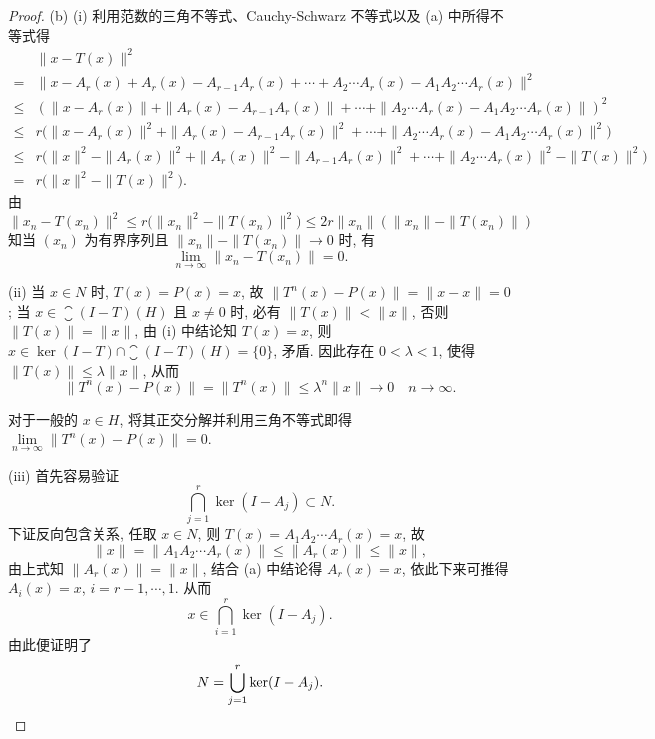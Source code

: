\begin{proof}
    (b) (i) 利用范数的三角不等式、Cauchy-Schwarz 不等式以及 (a) 中所得不等式得
    \begin{align*}
               & \|x-T(x)\|^2 \\
        ={}    & \|x-A_r(x)+A_r(x)-A_{r-1}A_r(x)+\cdots+A_2\cdots A_r(x)-A_1A_2\cdots A_r(x)\|^2 \\
        \leq{} & (\|x-A_r(x)\|+\|A_r(x)-A_{r-1}A_r(x)\|+\cdots+\|A_2\cdots A_r(x)-A_1A_2\cdots A_r(x)\|)^2 \\
        \leq{} & r\bigl(\|x-A_r(x)\|^2+\|A_r(x)-A_{r-1}A_r(x)\|^2+\cdots+\|A_2\cdots A_r(x)-A_1A_2\cdots A_r(x)\|^2\bigr) \\
        \leq{} & r\bigl(\|x\|^2-\|A_r(x)\|^2+\|A_r(x)\|^2-\|A_{r-1}A_r(x)\|^2+\cdots+\|A_2\cdots A_r(x)\|^2-\|T(x)\|^2\bigr) \\
        ={}    & r\bigl(\|x\|^2-\|T(x)\|^2\bigr).
    \end{align*}
    由
    \[\|x_n-T(x_n)\|^2\leq r\bigl(\|x_n\|^2-\|T(x_n)\|^2\bigr)\leq 2r\|x_n\|(\|x_n\|-\|T(x_n)\|)\]
    知当 $(x_n)$ 为有界序列且 $\|x_n\|-\|T(x_n)\|\to 0$ 时, 有
    \[\lim_{n\to\infty} \|x_n-T(x_n)\|=0.\]

    (ii) 当 $x\in N$ 时, $T(x)=P(x)=x$, 故 $\|T^n(x)-P(x)\|=\|x-x\|=0$;
    当 $x\in\closure{(I-T)(H)}$ 且 $x\ne 0$ 时, 必有 $\|T(x)\|<\|x\|$,
    否则 $\|T(x)\|=\|x\|$, 由 (i) 中结论知 $T(x)=x$, 则
    $x\in\ker(I-T)\cap\closure{(I-T)(H)}=\{0\}$, 矛盾. 因此存在 $0<\lambda<1$,
    使得 $\|T(x)\|\leq\lambda\|x\|$, 从而
    \[\|T^n(x)-P(x)\|=\|T^n(x)\|\leq\lambda^n\|x\|\to 0\quad n\to\infty.\]

    对于一般的 $x\in H$, 将其正交分解并利用三角不等式即得 $\lim\limits_{n\to\infty}\|T^n(x)-P(x)\|=0$.

    (iii) 首先容易验证
    \[\bigcap_{j=1}^r \ker(I-A_j)\subset N.\]
    下证反向包含关系, 任取 $x\in N$, 则 $T(x)=A_1A_2\cdots A_{r}(x)=x$, 故
    \[\|x\|=\|A_1A_2\cdots A_r(x)\|\leq\|A_r(x)\|\leq\|x\|,\]
    由上式知 $\|A_r(x)\|=\|x\|$, 结合 (a) 中结论得 $A_r(x)=x$, 依此下来可推得
    $A_i(x)=x$, $i=r-1,\cdots,1$. 从而
    \[x\in\bigcap_{i=1}^r \ker(I-A_j).\]
    由此便证明了
    \[N=\bigcup_{j=1}^r \ker(I-A_j).\qedhere\]
\end{proof}

